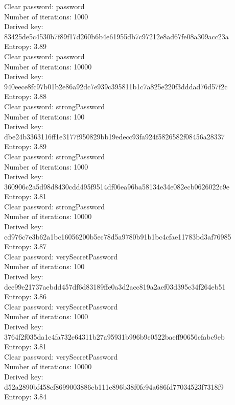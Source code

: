 \documentclass{article}
\begin{document}
Clear password: password\\
Number of iterations: 1000\\
Derived key: 83425de5c4530b7f89f17d260b6b4e61955db7c97212e8ad67fe08a309acc23a\\
Entropy: 3.89\\

Clear password: password\\
Number of iterations: 10000\\
Derived key: 940eece8fc97b01b2e86a92dc7e939c395811b1c7a825e220f3dddad76d57f2c\\
Entropy: 3.88\\

Clear password: strongPassword\\
Number of iterations: 100\\
Derived key: dbe24b3363116ff1e3177f950829bb19edecc93fa924f5826582f08456a28337\\
Entropy: 3.89\\

Clear password: strongPassword\\
Number of iterations: 1000\\
Derived key: 360906c2a5d98d8430cdd495f9514df06ea96ba58134e34e082ecb0626022c9e\\
Entropy: 3.81\\

Clear password: strongPassword\\
Number of iterations: 10000\\
Derived key: cd976c7e3b62a1bc16056200b5ec78d5a9780b91b1bc4cfae11783bd3af76985\\
Entropy: 3.87\\

Clear password: verySecretPassword\\
Number of iterations: 100\\
Derived key: dee99e21737aebdd457df6d83189ffe0a3d2acc819a2aef03d395e34f264eb51\\
Entropy: 3.86\\

Clear password: verySecretPassword\\
Number of iterations: 1000\\
Derived key: 3764f2f035da1e4fa732c64311b27a95931b996b9c0522baeff90656cfabc9eb\\
Entropy: 3.81\\

Clear password: verySecretPassword\\
Number of iterations: 10000\\
Derived key: d52a2890bf458cf8699003886cb111e896b38f0fe94a686fd77034523f7318f9\\
Entropy: 3.84\\
\end{document}
